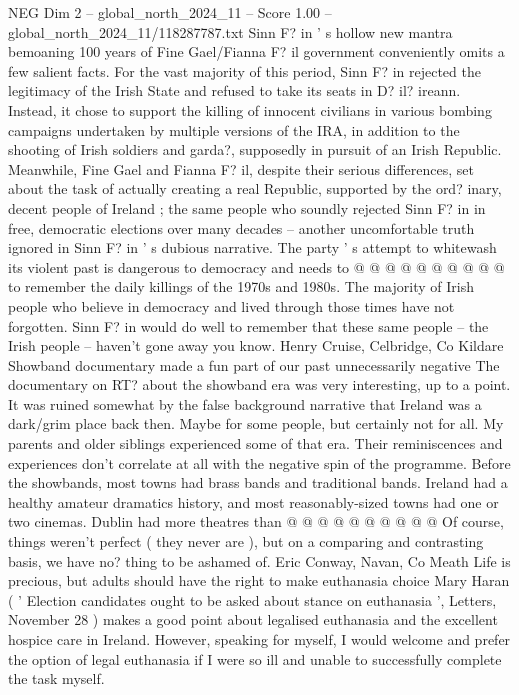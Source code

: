 \begin{textsample}{NEG Dim 2 – global\_north\_2024\_11 – Score 1.00 – global\_north\_2024\_11/118287787.txt}  \label{ex:f2_neg_186}
Sinn F? in ' s hollow new mantra bemoaning 100 years of Fine Gael/Fianna F? il government conveniently omits a few salient facts.
For the vast majority of this period, Sinn F? in rejected the legitimacy of the Irish State and refused to take its seats in D? il? ireann.
Instead, it chose to support the killing of innocent civilians in various bombing campaigns undertaken by multiple versions of the IRA, in addition to the shooting of Irish soldiers and garda?, supposedly in pursuit of an Irish Republic.
Meanwhile, Fine Gael and Fianna F? il, despite their serious differences, set about the task of actually creating a real Republic, supported by the ord? inary, decent people of Ireland ; the same people who soundly rejected Sinn F? in in free, democratic elections over many decades -- another uncomfortable truth ignored in Sinn F? in ' s dubious narrative.
The party ' s attempt to whitewash its violent past is dangerous to democracy and needs to @ @ @ @ @ @ @ @ @ @ to remember the daily killings of the 1970s and 1980s.
The majority of Irish people who believe in democracy and lived through those times have not forgotten.
Sinn F? in would do well to remember that these same people -- the Irish people -- haven't gone away you know.
Henry Cruise, Celbridge, Co Kildare Showband documentary made a fun part of our past unnecessarily negative The documentary on RT? about the showband era was very interesting, up to a point.
It was ruined somewhat by the false background narrative that Ireland was a dark/grim place back then.
Maybe for some people, but certainly not for all.
My parents and older siblings experienced some of that era.
Their reminiscences and experiences don't correlate at all with the negative spin of the programme.
Before the showbands, most towns had brass bands and traditional bands.
Ireland had a healthy amateur dramatics history, and most reasonably-sized towns had one or two cinemas.
Dublin had more theatres than @ @ @ @ @ @ @ @ @ @ Of course, things weren't perfect ( they never are ), but on a comparing and contrasting basis, we have no? thing to be ashamed of.
Eric Conway, Navan, Co Meath Life is precious, but adults should have the right to make euthanasia choice Mary Haran ( ' Election candidates ought to be asked about stance on euthanasia ', Letters, November 28 ) makes a good point about legalised euthanasia and the excellent hospice care in Ireland.
However, speaking for myself, I would welcome and prefer the option of legal euthanasia if I were so ill and unable to successfully complete the task myself.

\end{textsample}
